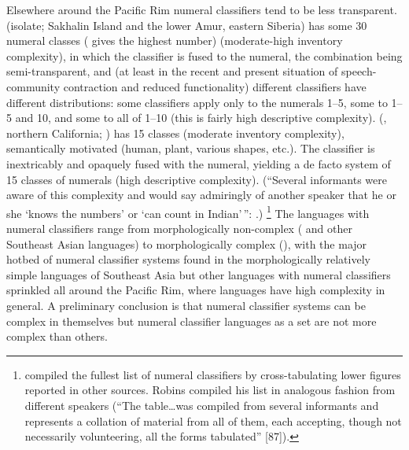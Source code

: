 \documentclass[output=collectionpaper]{langsci/langscibook}
\begin{document}
Elsewhere around the Pacific Rim numeral classifiers tend to be less transparent.  (isolate; Sakhalin Island and the lower Amur, eastern Siberia) has some 30 numeral classes (\citealt{Mattissen2003} gives the highest number) (moderate-high inventory complexity), in which the classifier is fused to the numeral, the combination being semi-transparent, and (at least in the recent and present situation of speech-community contraction and reduced functionality) different classifiers have different distributions: some classifiers apply only to the numerals 1--5, some to 1--5 and 10, and some to all of 1--10 (this is fairly high descriptive complexity).  (, northern California; \citealt[86--91]{Robins1958}) has 15 classes (moderate inventory complexity), semantically motivated (human, plant, various shapes, etc.). The classifier is inextricably and opaquely fused with the numeral, yielding a de facto system of 15 classes of numerals (high descriptive complexity). (``Several informants were aware of this complexity and would say admiringly of another speaker that he or she `knows the numbers' or `can count in Indian'\,'': \citealt[87n]{Robins1958}.)%
\footnote{%
\citet{Mattissen2003} compiled the fullest list of  numeral classifiers by cross-tabulating lower figures reported in other sources. Robins compiled his list in analogous fashion from different speakers (``The table\ldots was compiled from several informants and represents a collation of material from all of them, each accepting, though not necessarily volunteering, all the forms tabulated'' [87]).
} %
The languages with numeral classifiers range from morphologically non-complex ( and other Southeast Asian languages) to morphologically complex (), with the major hotbed of numeral classifier systems found in the morphologically relatively simple languages of Southeast Asia but other languages with numeral classifiers sprinkled all around the Pacific Rim, where languages have high complexity in general. A preliminary conclusion is that numeral classifier systems can be complex in themselves but numeral classifier languages as a set are not more complex than others.
\end{document}
